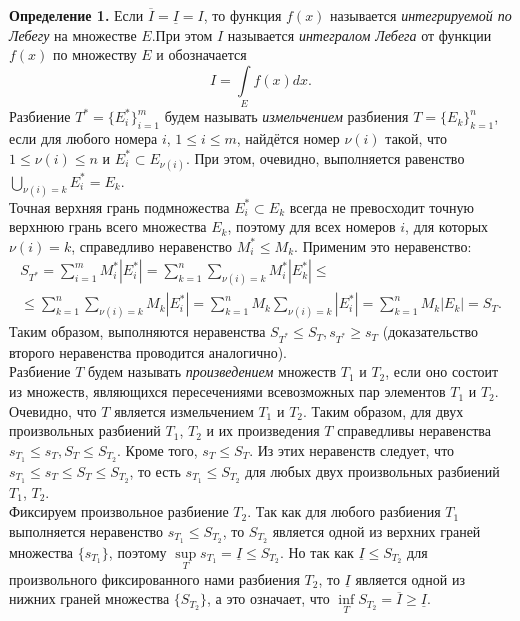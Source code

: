 \documentclass[12pt,a4paper, titlepage]{article}
\begin{document}
\textbf{Определение 1.} Если $\overline{I} = \underline{I} = I$, то функция $f(x)$ называется \textit{интегрируемой по Лебегу} на множестве $E$.При этом $I$ называется \textit{интегралом Лебега} от функции $f(x)$ по множеству $E$ и обозначается
$$
I = \int\limits_E f(x) dx.
$$
Разбиение $T^* = \lbrace E_i^* \rbrace_{i=1}^m$ будем называть \textit{измельчением} разбиения $T = \lbrace E_k \rbrace_{k=1}^n$, если для любого номера $i$, $1\leqslant i \leqslant m$, найдётся номер $\nu(i)$ такой, что $1 \leqslant \nu(i) \leqslant n$ и $E_i^* \subset E_{\nu (i)}$. При этом, очевидно, выполняется равенство $\bigcup\limits_{\nu(i) = k} E_i^* = E_k$.\\

Точная верхняя грань подмножества $E_i^* \subset E_k$ всегда не превосходит точную верхнюю грань всего множества $E_k$, поэтому для всех номеров $i$, для которых $\nu(i) = k$, справедливо неравенство $M_i^* \leqslant M_k$. Применим это неравенство:
\begin{multline*}
S_{T^*} = \sum_{i=1}^m M_i^* |E_i^*| = \sum_{k=1}^n \sum_{\nu(i) = k} M_i^* |E_k^*| \leqslant \\
\leqslant \sum_{k=1}^n \sum_{\nu(i) = k} M_k |E_i^*| = \sum_{k=1}^n M_k \sum_{\nu(i) = k} |E_i^*| = \sum_{k=1}^n M_k |E_k| = S_T.
\end{multline*}
Таким образом, выполняются неравенства $S_{T^*} \leqslant S_T, s_{T^*} \geqslant s_T$ (доказательство второго неравенства проводится аналогично).\\

Разбиение $T$ будем называть \textit{произведением} множеств $T_1$ и $T_2$, если оно состоит из множеств, являющихся пересечениями всевозможных пар элементов $T_1$ и $T_2$.\\

Очевидно, что $T$ является измельчением $T_1$ и $T_2$. Таким образом, для двух произвольных разбиений $T_1$, $T_2$ и их произведения $T$ справедливы неравенства $s_{T_1} \leqslant s_T, S_{T} \leqslant S_{T_2}$. Кроме того, $s_T \leqslant S_T$. Из этих неравенств следует, что $s_{T_1} \leqslant s_T \leqslant S_T \leqslant S_{T_2}$, то есть $s_{T_1} \leqslant S_{T_2}$ для любых двух произвольных разбиений $T_1$, $T_2$.\\

Фиксируем произвольное разбиение $T_2$. Так как для любого разбиения $T_1$ выполняется неравенство $s_{T_1} \leqslant S_{T_2}$, то $S_{T_2}$ является одной из верхних граней множества $\lbrace s_{T_1} \rbrace$, поэтому $\sup\limits_T s_{T_1} = \underline{I} \leqslant S_{T_2}$. Но так как $\underline{I} \leqslant S_{T_2}$ для произвольного фиксированного нами разбиения $T_2$, то $\underline{I}$ является одной из нижних граней множества $\lbrace S_{T_2} \rbrace$, а это означает, что $\inf\limits_T S_{T_2} = \overline{I} \geqslant \underline{I}$.\\
\end{document}
